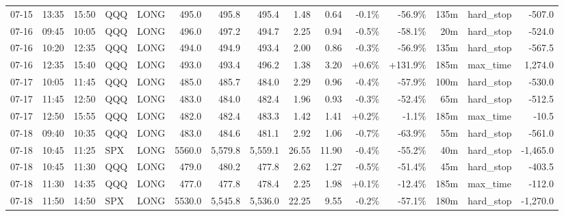 \documentclass[11pt,a4paper,twoside]{article}
\begin{document}
\begin{landscape}
\begin{center}
\begin{longtable}{>{\color{txtmain}}l l l l l r r r r r r r r >{\color{txtmain}}l r}
07-15 & 13:35 & 15:50 & QQQ & LONG & 495.0 & 495.8 & 495.4 & 1.48 & 0.64 & \textcolor{lossred}{-0.1\%} & \textcolor{lossred}{-56.9\%} & 135m & hard\_stop & \textcolor{lossred}{-507.0} \\
07-16 & 09:45 & 10:05 & QQQ & LONG & 496.0 & 497.2 & 494.7 & 2.25 & 0.94 & \textcolor{lossred}{-0.5\%} & \textcolor{lossred}{-58.1\%} & 20m & hard\_stop & \textcolor{lossred}{-524.0} \\
07-16 & 10:20 & 12:35 & QQQ & LONG & 494.0 & 494.9 & 493.4 & 2.00 & 0.86 & \textcolor{lossred}{-0.3\%} & \textcolor{lossred}{-56.9\%} & 135m & hard\_stop & \textcolor{lossred}{-567.5} \\
07-16 & 12:35 & 15:40 & QQQ & LONG & 493.0 & 493.4 & 496.2 & 1.38 & 3.20 & \textcolor{wingreen}{+0.6\%} & \textcolor{wingreen}{+131.9\%} & 185m & max\_time & \textcolor{wingreen}{1,274.0} \\
07-17 & 10:05 & 11:45 & QQQ & LONG & 485.0 & 485.7 & 484.0 & 2.29 & 0.96 & \textcolor{lossred}{-0.4\%} & \textcolor{lossred}{-57.9\%} & 100m & hard\_stop & \textcolor{lossred}{-530.0} \\
07-17 & 11:45 & 12:50 & QQQ & LONG & 483.0 & 484.0 & 482.4 & 1.96 & 0.93 & \textcolor{lossred}{-0.3\%} & \textcolor{lossred}{-52.4\%} & 65m & hard\_stop & \textcolor{lossred}{-512.5} \\
07-17 & 12:50 & 15:55 & QQQ & LONG & 482.0 & 482.4 & 483.3 & 1.42 & 1.41 & \textcolor{wingreen}{+0.2\%} & \textcolor{lossred}{-1.1\%} & 185m & max\_time & \textcolor{lossred}{-10.5} \\
07-18 & 09:40 & 10:35 & QQQ & LONG & 483.0 & 484.6 & 481.1 & 2.92 & 1.06 & \textcolor{lossred}{-0.7\%} & \textcolor{lossred}{-63.9\%} & 55m & hard\_stop & \textcolor{lossred}{-561.0} \\
07-18 & 10:45 & 11:25 & SPX & LONG & 5560.0 & 5,579.8 & 5,559.1 & 26.55 & 11.90 & \textcolor{lossred}{-0.4\%} & \textcolor{lossred}{-55.2\%} & 40m & hard\_stop & \textcolor{lossred}{-1,465.0} \\
07-18 & 10:45 & 11:30 & QQQ & LONG & 479.0 & 480.2 & 477.8 & 2.62 & 1.27 & \textcolor{lossred}{-0.5\%} & \textcolor{lossred}{-51.4\%} & 45m & hard\_stop & \textcolor{lossred}{-403.5} \\
07-18 & 11:30 & 14:35 & QQQ & LONG & 477.0 & 477.8 & 478.4 & 2.25 & 1.98 & \textcolor{wingreen}{+0.1\%} & \textcolor{lossred}{-12.4\%} & 185m & max\_time & \textcolor{lossred}{-112.0} \\
07-18 & 11:50 & 14:50 & SPX & LONG & 5530.0 & 5,545.8 & 5,536.0 & 22.25 & 9.55 & \textcolor{lossred}{-0.2\%} & \textcolor{lossred}{-57.1\%} & 180m & hard\_stop & \textcolor{lossred}{-1,270.0} \\

\end{longtable}
\end{center}
\end{landscape}
\end{document}
